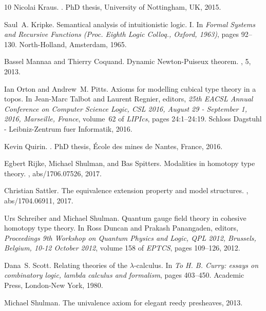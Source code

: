 \documentclass[10pt,a4paper,draft]{article}
\renewcommand{\~}{\widetilde}
\theoremstyle{definition}
\theoremstyle{remark} %
\begin{document}
\begin{thebibliography}{10}
Nicolai Kraus.
.
\newblock PhD thesis, University of Nottingham, {UK}, 2015.

Saul~A. Kripke.
\newblock Semantical analysis of intuitionistic logic. {I}.
\newblock In {\em Formal {S}ystems and {R}ecursive {F}unctions ({P}roc.
  {E}ighth {L}ogic {C}olloq., {O}xford, 1963)}, pages 92--130. North-Holland,
  Amsterdam, 1965.

Bassel Mannaa and Thierry Coquand.
\newblock Dynamic {Newton}-{Puiseux} theorem.
, 5, 2013.

Ian Orton and Andrew~M. Pitts.
\newblock Axioms for modelling cubical type theory in a topos.
\newblock In Jean{-}Marc Talbot and Laurent Regnier, editors, {\em 25th {EACSL}
  Annual Conference on Computer Science Logic, {CSL} 2016, August 29 -
  September 1, 2016, Marseille, France}, volume~62 of {\em LIPIcs}, pages
  24:1--24:19. Schloss Dagstuhl - Leibniz-Zentrum fuer Informatik, 2016.

Kevin Quirin.
.
\newblock PhD thesis, {\'{E}}cole des mines de Nantes, France, 2016.

Egbert Rijke, Michael Shulman, and Bas Spitters.
\newblock Modalities in homotopy type theory.
, abs/1706.07526, 2017.

Christian Sattler.
\newblock The equivalence extension property and model structures.
, abs/1704.06911, 2017.

Urs Schreiber and Michael Shulman.
\newblock Quantum gauge field theory in cohesive homotopy type theory.
\newblock In Ross Duncan and Prakash Panangaden, editors, {\em Proceedings 9th
  Workshop on Quantum Physics and Logic, {QPL} 2012, Brussels, Belgium, 10-12
  October 2012}, volume 158 of {\em {EPTCS}}, pages 109--126, 2012.

Dana~S. Scott.
\newblock Relating theories of the {$\lambda $}-calculus.
\newblock In {\em To {H}. {B}. {C}urry: essays on combinatory logic, lambda
  calculus and formalism}, pages 403--450. Academic Press, London-New York,
  1980.

Michael Shulman.
\newblock The univalence axiom for elegant reedy presheaves, 2013.


\end{thebibliography}
\end{document}
